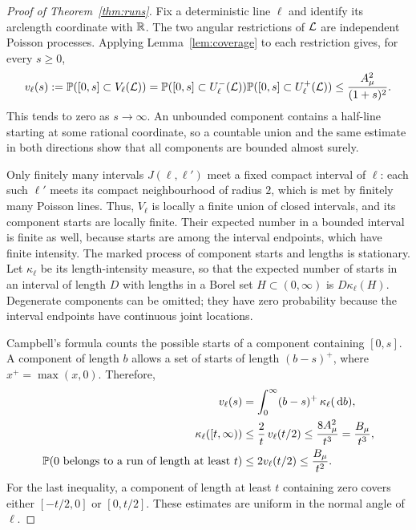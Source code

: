 \documentclass[11pt,letterpaper]{article}
\begin{document}
\begin{proof}[Proof of Theorem~\ref{thm:runs}]
Fix a deterministic line $\ell$ and identify its arclength coordinate with $\mathbb R$. The two angular restrictions of $\mathcal L$ are independent Poisson processes. Applying Lemma~\ref{lem:coverage} to each restriction gives, for every $s\ge0$,
\begin{equation}\label{eq:double}
 v_\ell(s):=\mathbb P([0,s]\subset V_\ell(\mathcal L))
  =\mathbb P([0,s]\subset U_\ell^-(\mathcal L))
   \mathbb P([0,s]\subset U_\ell^+(\mathcal L))
  \le\frac{A_\mu^2}{(1+s)^2}.
\end{equation}
This tends to zero as $s\to\infty$. An unbounded component contains a half-line starting at some rational coordinate, so a countable union and the same estimate in both directions show that all components are bounded almost surely.

Only finitely many intervals $J(\ell,\ell')$ meet a fixed compact interval of $\ell$: each such $\ell'$ meets its compact neighbourhood of radius $2$, which is met by finitely many Poisson lines. Thus, $V_\ell$ is locally a finite union of closed intervals, and its component starts are locally finite. Their expected number in a bounded interval is finite as well, because starts are among the interval endpoints, which have finite intensity. The marked process of component starts and lengths is stationary. Let $\kappa_\ell$ be its length-intensity measure, so that the expected number of starts in an interval of length $D$ with lengths in a Borel set $H\subset(0,\infty)$ is $D\kappa_\ell(H)$. Degenerate components can be omitted; they have zero probability because the interval endpoints have continuous joint locations.

Campbell's formula \cite[Section~2.2]{LP17} counts the possible starts of a component containing $[0,s]$. A component of length $b$ allows a set of starts of length $(b-s)^+$, where $x^+=\max(x,0)$. Therefore,
\begin{equation}\label{eq:component-intensity}
\begin{aligned}
 v_\ell(s)&=\int_0^\infty(b-s)^+\,\kappa_\ell(\,\mathrm{d} b),\\
 \kappa_\ell([t,\infty))
   &\le\frac2t\,v_\ell(t/2)
    \le\frac{8A_\mu^2}{t^3}=\frac{B_\mu}{t^3},\\
 \mathbb P(0\text{ belongs to a run of length at least }t)
   &\le2v_\ell(t/2)\le\frac{B_\mu}{t^2}.
\end{aligned}
\end{equation}
For the last inequality, a component of length at least $t$ containing zero covers either $[-t/2,0]$ or $[0,t/2]$. These estimates are uniform in the normal angle of $\ell$.


\end{proof}
\end{document}
